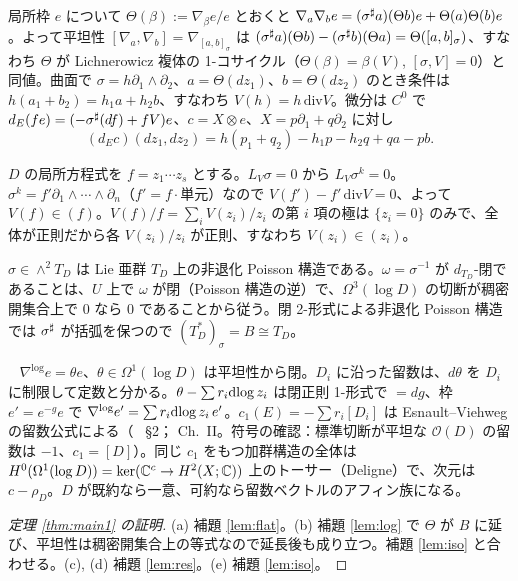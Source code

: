 \begin{lem}\tP\label{lem:flat}
局所枠 $e$ について $\Theta(\beta):=\nabla_\beta e/e$ とおくと $\nabla_a\nabla_be=(\sigma^\sharp a)(\Theta b)e+\Theta(a)\Theta(b)e$。よって平坦性 $[\nabla_a,\nabla_b]=\nabla_{[a,b]_\sigma}$ は $(\sigma^\sharp a)(\Theta b)-(\sigma^\sharp b)(\Theta a)=\Theta([a,b]_\sigma)$、すなわち $\Theta$ が Lichnerowicz 複体の 1-コサイクル（$\Theta(\beta)=\beta(V)$, $[\sigma,V]=0$）と同値。曲面で $\sigma=h\partial_1\wedge\partial_2$、$a=\Theta(dz_1)$、$b=\Theta(dz_2)$ のとき条件は $h(a_1+b_2)=h_1a+h_2b$、すなわち $V(h)=h\,\mathrm{div}V$。微分は $C^0$ で $d_E(fe)=(-\sigma^\sharp(df)+fV)e$、$c=X\otimes e$、$X=p\partial_1+q\partial_2$ に対し
\begin{equation}\label{eq:dE}
(d_Ec)(dz_1,dz_2)=h(p_1+q_2)-h_1p-h_2q+qa-pb.
\end{equation}
\end{lem}
\begin{lem}[$V$ は対数的]\tP\label{lem:log}
$D$ の局所方程式を $f=z_1\cdots z_s$ とする。$L_V\sigma=0$ から $L_V\sigma^k=0$。$\sigma^k=f'\partial_1\wedge\cdots\wedge\partial_n$（$f'=f\cdot$単元）なので $V(f')-f'\,\mathrm{div}V=0$、よって $V(f)\in(f)$。$V(f)/f=\sum_iV(z_i)/z_i$ の第 $i$ 項の極は $\{z_i=0\}$ のみで、全体が正則だから各 $V(z_i)/z_i$ が正則、すなわち $V(z_i)\in(z_i)$。
\end{lem}
\begin{lem}\tP\label{lem:iso}
$\sigma\in\wedge^2T_D$ は Lie 亜群 $T_D$ 上の非退化 Poisson 構造である。$\omega=\sigma^{-1}$ が $d_{T_D}$-閉であることは、$U$ 上で $\omega$ が閉（Poisson 構造の逆）で、$\Omega^3(\log D)$ の切断が稠密開集合上で 0 なら 0 であることから従う。閉 2-形式による非退化 Poisson 構造では $\sigma^\sharp$ が括弧を保つので $(T_D^*)_\sigma=B\cong T_D$。
\end{lem}
\begin{lem}[留数・局所標準形・$c_1$]\tP\ \tC\label{lem:res}
$\nabla^{\log}e=\theta e$、$\theta\in\Omega^1(\log D)$ は平坦性から閉。$D_i$ に沿った留数は、$d\theta$ を $D_i$ に制限して定数と分かる。$\theta-\sum r_i\mathrm{dlog}\, z_i$ は閉正則 1-形式で $=dg$、枠 $e'=e^{-g}e$ で $\nabla^{\log}e'=\sum r_i\mathrm{dlog}\, z_i\,e'$。$c_1(E)=-\sum r_i[D_i]$ は Esnault--Viehweg の留数公式による（\tC\ \cite{EV} \S2；\cite{Del} Ch.~II。符号の確認：標準切断が平坦な $\mathcal O(D)$ の留数は $-1$、$c_1=[D]$）。同じ $c_1$ をもつ加群構造の全体は $H^0(\Omega^1(\log D))=\ker(\mathbb C^c\to H^2(X;\mathbb C))$ 上のトーサー（Deligne）で、次元は $c-\rho_D$。$D$ が既約なら一意、可約なら留数ベクトルのアフィン族になる。
\end{lem}
\begin{proof}[定理 \ref{thm:main1} の証明]
(a) 補題 \ref{lem:flat}。(b) 補題 \ref{lem:log} で $\Theta$ が $B$ に延び、平坦性は稠密開集合上の等式なので延長後も成り立つ。補題 \ref{lem:iso} と合わせる。(c), (d) 補題 \ref{lem:res}。(e) 補題 \ref{lem:iso}。
\end{proof}
